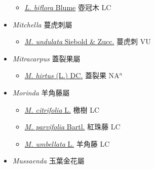 \begin{itemize}
  \begin{itemize}
        \item[] \href{http://www.theplantlist.org/tpl1.1/search?q=Litosanthes+biflora}{\textit{L. biflora} Blume}   壺冠木 LC
  \end{itemize}
 \item[] \textit{Mitchella} 蔓虎刺屬
                    
  \begin{itemize}
        \item[] \href{http://www.theplantlist.org/tpl1.1/search?q=Mitchella+undulata}{\textit{M. undulata} Siebold \& Zucc.}   蔓虎刺 VU
  \end{itemize}
 \item[] \textit{Mitracarpus} 蓋裂果屬
                    
  \begin{itemize}
        \item[] \href{http://www.theplantlist.org/tpl1.1/search?q=Mitracarpus+hirtus}{\textit{M. hirtus} (L.) DC.}   蓋裂果 NA$^n$
  \end{itemize}
 \item[] \textit{Morinda} 羊角藤屬
                    
  \begin{itemize}
        \item[] \href{http://www.theplantlist.org/tpl1.1/search?q=Morinda+citrifolia}{\textit{M. citrifolia} L.}   檄樹 LC
        \item[] \href{http://www.theplantlist.org/tpl1.1/search?q=Morinda+parvifolia}{\textit{M. parvifolia} Bartl.}   紅珠藤 LC
        \item[] \href{http://www.theplantlist.org/tpl1.1/search?q=Morinda+umbellata}{\textit{M. umbellata} L.}   羊角藤 LC
  \end{itemize}
 \item[] \textit{Mussaenda} 玉葉金花屬
                    

\end{itemize}
